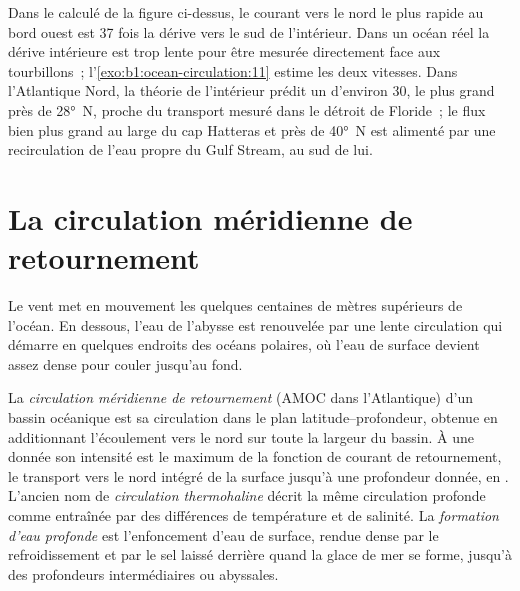 Dans le  calculé de la figure ci-dessus, le courant vers le nord le plus rapide au
bord ouest est 37 fois la dérive vers le sud de l'intérieur. Dans un océan réel
la dérive intérieure est trop lente pour être mesurée directement face aux tourbillons~;
l'\cref{exo:b1:ocean-circulation:11} estime les deux vitesses.
Dans l'Atlantique Nord, la théorie de l'intérieur prédit un 
d'environ \qty{30}{\sverdrup}, le plus grand près de \ang{28}~N, proche du transport
mesuré dans le détroit de Floride~; le flux bien plus grand au large du cap Hatteras et près de
\ang{40}~N est alimenté par une recirculation de l'eau propre du Gulf Stream, au sud de lui.

\section{La circulation méridienne de retournement}\label{sec:b1:ocean-circulation:moc}

Le vent met en mouvement les quelques centaines de mètres supérieurs de l'océan. En dessous, l'eau de
l'abysse est renouvelée par une lente circulation qui démarre en quelques endroits des océans
polaires, où l'eau de surface devient assez dense pour couler jusqu'au fond.

\begin{definition}\label{def:b1:ocean-circulation:moc}
La \emph{circulation méridienne de retournement} (AMOC dans l'Atlantique) d'un bassin océanique est sa
circulation dans le plan latitude--profondeur,
obtenue en additionnant l'écoulement vers le nord sur toute la largeur du bassin. À une
 donnée son intensité est le maximum de la fonction de courant de retournement, le
transport vers le nord intégré de la surface jusqu'à une profondeur donnée, en
. L'ancien nom de \emph{circulation
thermohaline} décrit la même circulation profonde comme
entraînée par des différences de température et de salinité. La \emph{formation d'eau
profonde} est l'enfoncement d'eau de surface, rendue dense
par le refroidissement et par le sel laissé derrière quand la glace de mer se forme, jusqu'à des profondeurs intermédiaires ou abyssales.
\end{definition}

